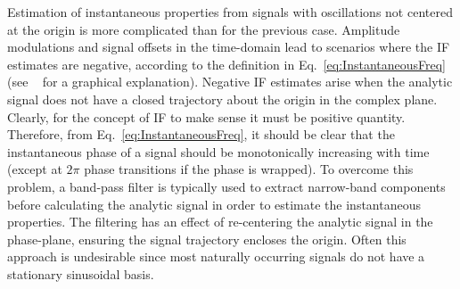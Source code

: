 \documentclass[a4paper]{IEEEtran}
\begin{document}
Estimation of instantaneous properties from signals with oscillations not centered at the origin is more complicated than for the previous case. Amplitude modulations and signal offsets in the time-domain lead to scenarios where the IF estimates are negative, according to the definition in Eq.~\ref{eq:InstantaneousFreq} (see ~\cite{Huang1998} for a graphical explanation). Negative IF estimates arise when the analytic signal does not have a closed trajectory about the origin in the complex plane. Clearly, for the concept of IF to make sense it must be positive quantity. Therefore, from Eq.~\ref{eq:InstantaneousFreq}, it should be clear that the instantaneous phase of a signal should be monotonically increasing with time (except at $2\pi$ phase transitions if the phase is wrapped). To overcome this problem, a band-pass filter is typically used to extract narrow-band components before calculating the analytic signal in order to estimate the instantaneous properties. The filtering has an effect of re-centering the analytic signal in the phase-plane, ensuring the signal trajectory encloses the origin. Often this approach is undesirable since most naturally occurring signals do not have a stationary sinusoidal basis. 

\end{document}
